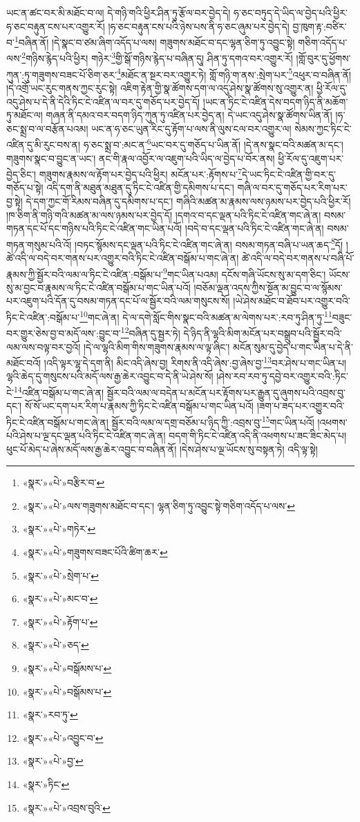 ཡང་ན་ཚང་བར་མི་མཐོང་བ་ལ། དེ་གཉི་གའི་ཕྱིར་ཤིན་ཏུ་རྩོལ་བར་བྱེད་དེ། ཧ་ཅང་བཏུད་དེ་ཡིད་ལ་བྱེད་པའི་ཕྱིར་ཧ་ཅང་བརྟུན་ངས་པར་འགྱུར་རོ། །ཧ་ཅང་བརྟུན་ངས་པའི་ཉེས་པས་ནི་ཧ་ཅང་ཞུམ་པར་བྱེད་དེ། བྱ་ཁུག་རྟ་:བཙིར་བ་\footnote{«སྣར་»«པེ་»བརྩིར་བ་}བཞིན་ནོ། །དེ་སྣང་བ་ཙམ་ཞིག་འདོད་པ་ལས། གཟུགས་མཐོང་བ་དང་ལྷན་ཅིག་ཏུ་འབྱུང་སྟེ། གཅིག་འདོད་པ་ལས་\footnote{«སྣར་»«པེ་»ལས་གཟུགས་མཐོང་བ་དང་། ལྷན་ཅིག་ཏུ་འབྱུང་སྟེ་གཅིག་འདོད་པ་ལས་}གཉིས་རྙེད་པའི་ཕྱིར། གཉེར་\footnote{«སྣར་»«པེ་»གཏེར་}གྱི་སྒོ་གཉིས་རྙེད་པ་བཞིན་དུ། ཤིན་ཏུ་དགའ་བར་འགྱུར་རོ། །གློ་བུར་དུ་ཕྱོགས་ཀུན་:ཏུ་གཟུགས་བཟང་པོ་ཅིག་ཅར་\footnote{«སྣར་»«པེ་»གཟུགས་བཟང་པོའི་ཚིག་ཆར་}མཐོང་ན་སྔར་བར་འགྱུར་ཏེ། གློ་གཉི་ག་ནས་:སྲེག་པར་\footnote{«སྣར་»«པེ་»སྲེག་པ་}འཕུར་བ་བཞིན་ནོ། །དེ་འགྲོ་ཡང་རུང་གནས་ཀྱང་རུང་སྟེ། འཇིག་རྟེན་གྱི་སྣ་ཚོགས་དག་ལ་འདུ་ཤེས་སྣ་ཚོགས་སུ་འགྱུར་ན། ཕྱི་རོལ་དུ་འདུ་ཤེས་པ་དེ་ནི་དེའི་ཏིང་ངེ་འཛིན་ལ་བར་དུ་གཅོད་པར་བྱེད་དོ། །ཡང་ན་ཏིང་ངེ་འཛིན་དེས་བདག་ཉིད་ནི་མཆོག་ཏུ་མཐོང་ལ། གཞན་ནི་དམའ་བར་བདག་ཉིད་ཀུན་ཏུ་འཛིན་པར་བྱེད་ན། དེ་ཡང་འདུ་ཤེས་སྣ་ཚོགས་ཡིན་ནོ། །ཧ་ཅང་སྨྲ་བ་ལ་བརྩོན་པའམ། ཡང་ན་ཧ་ཅང་ཡུན་རིང་དུ་རྟོག་པ་ལས་ནི་ལུས་ངལ་བར་འགྱུར་ལ། སེམས་ཀྱང་ཏིང་ངེ་འཛིན་དུ་མི་རུང་བས་ན། ཧ་ཅང་སྨྲ་བ་:མང་ན་\footnote{«སྣར་»«པེ་»མང་བ་}ཡང་བར་དུ་གཅོད་པ་ཡིན་ནོ། །དེ་ནས་སྣང་བའི་མཚན་མ་དང་། གཟུགས་སྣང་བ་བྱུང་ན་ཡང་། ནང་གི་རྣལ་འབྱོར་ལ་འཇུག་པའི་ཡིད་ལ་བྱེད་པ་བོར་ནས། ཕྱི་རོལ་དུ་འཇུག་པར་བྱེད་ཅིང་། གཟུགས་རྣམས་ལ་རྟོག་པར་བྱེད་པའི་ཕྱིར། མངོན་པར་:རྟོགས་པ་\footnote{«སྣར་»«པེ་»རྟོག་པ་}དེ་ཡང་ཏིང་ངེ་འཛིན་གྱི་བར་དུ་གཅོད་པ་སྟེ། འདི་དག་ནི་མཐུན་མཐུན་དུ་ཏིང་ངེ་འཛིན་གྱི་དམིགས་པ་དང་། གཞི་ལ་བར་དུ་གཅོད་པར་རིག་པར་བྱ་སྟེ། དེ་དག་ཀྱང་གོ་རིམས་བཞིན་དུ་དམིགས་པ་དང་། གཞིའི་མཚན་མ་རྣམས་ལས་ཉམས་པར་བྱེད་པའི་ཕྱིར་རོ། །ཁ་ཅིག་ནི་གཉི་གའི་མཚན་མ་ལས་ཉམས་པར་བྱེད་དོ། །དགའ་བ་དང་ལྡན་པའི་ཏིང་ངེ་འཛིན་གང་ཞེ་ན། བསམ་གཏན་དང་པོ་དང་གཉིས་པའི་ཏིང་ངེ་འཛིན་གང་ཡིན་པའོ། །བདེ་བ་དང་ལྡན་པའི་ཏིང་ངེ་འཛིན་གང་ཞེ་ན། བསམ་གཏན་གསུམ་པའི་འོ། །བཏང་སྙོམས་དང་ལྡན་པའི་ཏིང་ངེ་འཛིན་གང་ཞེ་ན། བསམ་གཏན་བཞི་པ་ཡན་ཆད་\footnote{«སྣར་»«པེ་»ཅད་}དོ། །ཚེ་འདི་ལ་བདེ་བར་གནས་པར་འགྱུར་བའི་ཏིང་ངེ་འཛིན་བསྒོམ་པ་གང་ཞེ་ན། ཚེ་འདི་ལ་བདེ་བར་གནས་པ་བཞི་པོ་རྣམས་ཀྱི་སྦྱོར་བའི་ལམ་ལ་ཏིང་ངེ་འཛིན་:བསྒོམ་པ་\footnote{«སྣར་»«པེ་»བསྒོམས་པ་}གང་ཡིན་པའམ། དངོས་གཞི་ཡོངས་སུ་མ་དག་ཅིང་། ཡོངས་སུ་མ་བྱང་བ་རྣམས་ལ་ཏིང་ངེ་འཛིན་བསྒོམ་པ་གང་ཡིན་པའོ། །བཅོམ་ལྡན་འདས་ཀྱིས་སྔོན་མ་བྱུང་བ་ལ་སྙོམས་པར་འཇུག་པའི་དོན་དུ་བསམ་གཏན་དང་པོ་ལ་སྦྱོར་བའི་ལམ་གསུངས་སོ། །ཡེ་ཤེས་མཐོང་བ་ཐོབ་པར་འགྱུར་བའི་ཏིང་ངེ་འཛིན་:བསྒོམ་པ་\footnote{«སྣར་»«པེ་»བསྒོམས་པ་}གང་ཞེ་ན། དེ་ལ་དགེ་སློང་གིས་སྣང་བའི་མཚན་མ་ལེགས་པར་:རབ་ཏུ་ཤིན་ཏུ་\footnote{«སྣར་»རབ་ཏུ་}བཟུང་བར་གྱུར་ཅེས་བྱ་བ་མདོ་ལས་:བྱུང་བ་\footnote{«སྣར་»«པེ་»འབྱུང་བ་}བཞིན་དུ་སྦྱར་ཏེ། དེ་ཉིད་ནི་ལྷའི་མིག་མངོན་པར་བསྒྲུབ་པའི་སྦྱོར་བའི་ལམ་ལས་བལྟ་བར་བྱའོ། །དེ་ལ་ལྷའི་མིག་གིས་གཟུགས་རྣམས་ལ་ལྟ་ཞིང་། མངོན་སུམ་དུ་བྱེད་པ་གང་ཡིན་པ་དེ་ནི་མཐོང་བའོ། །འདི་ལྟར་ལྷ་དེ་དག་ནི། མིང་འདི་ཞེས་བྱ། རིགས་ནི་འདི་ཞེས་:བྱ་ཞེས་བྱ་\footnote{«སྣར་»«པེ་»བྱ་}བར་ཤེས་པ་གང་ཡིན་པ། ལྷའི་ཆེད་དུ་གསུངས་པའི་མདོ་ལས་རྒྱ་ཆེར་འབྱུང་བ་དེ་ནི་ཡེ་ཤེས་སོ། །ཤེས་རབ་རབ་ཏུ་དབྱེ་བར་འགྱུར་བའི་:ཏིང་ངེ་\footnote{«སྣར་»ཏིང་}འཛིན་བསྒོམ་པ་གང་ཞེ་ན། སྦྱོར་བའི་ལམ་ལ་བདེན་པ་མངོན་པར་རྟོགས་པར་རྒྱུན་དུ་ཞུགས་པའི་འབྲས་བུ་དང་། སོ་སོ་ཡང་དག་པར་རིག་པ་རྣམས་ཀྱི་ཏིང་ངེ་འཛིན་བསྒོམ་པ་གང་ཡིན་པའོ། །ཟག་པ་ཟད་པར་འགྱུར་བའི་ཏིང་ངེ་འཛིན་བསྒོམ་པ་གང་ཞེ་ན། སྦྱོར་བའི་ལམ་ལ་དགྲ་བཅོམ་པ་ཉིད་ཀྱི་:འབྲས་བུ་\footnote{«སྣར་»«པེ་»འབྲས་བུའི་}གང་ཡིན་པའོ། །འཕགས་པའི་ཤེས་པ་ལྔ་དང་ལྡན་པའི་ཏིང་ངེ་འཛིན་གང་ཞེ་ན། བདག་གི་ཏིང་ངེ་འཛིན་འདི་ནི་འཕགས་པ་ཟང་ཟིང་མེད་པ། ཕུང་པོ་མེད་པ་ཞེས་མདོ་ལས་རྒྱ་ཆེར་འབྱུང་བ་བཞིན་ནོ། །དེས་ཤེས་པ་ལྔ་ཡོངས་སུ་བསྟན་ཏེ། འདི་ལྟ་སྟེ། 